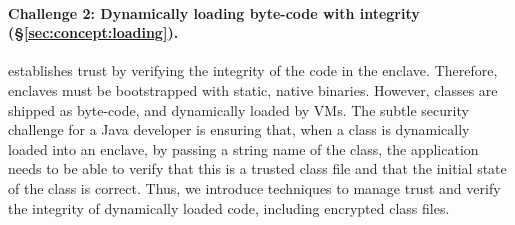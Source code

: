 



\paragraph{\bf Challenge 2: Dynamically loading byte-code with integrity (\S\ref{sec:concept:loading}).}
\sgx{} establishes trust by verifying the integrity of the code in the enclave.
Therefore, enclaves must be bootstrapped with static, native binaries.
However, \java{} classes are shipped as byte-code,
and dynamically loaded by \java{} VMs.
The subtle security challenge for a Java developer 
is ensuring that, when a class is dynamically loaded into an enclave, by passing a string name of the class,
the application needs to be able to verify that this is a trusted class file
and that the initial state of the class is correct.
Thus, we introduce techniques to manage trust and verify the integrity of 
dynamically loaded code, including encrypted class files.

